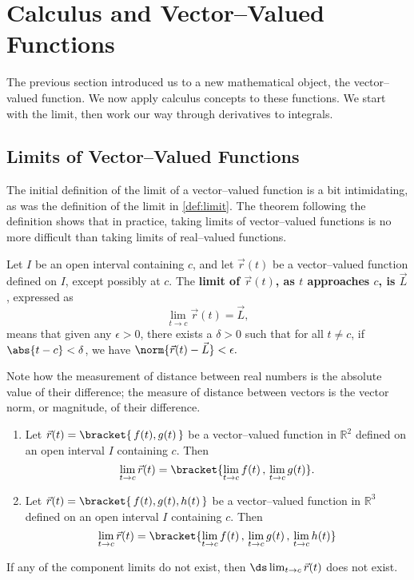 \section{Calculus and Vector--Valued Functions}\label{sec:vvf_calc}

The previous section introduced us to a new mathematical object, the vector--valued function. We now apply calculus concepts to these functions. We start with the limit, then work our way through derivatives to integrals.

\subsection*{Limits of Vector--Valued Functions}

The initial definition of the limit of a vector--valued function is a bit intimidating, as was the definition of the limit in \autoref{def:limit}. The theorem following the definition shows that in practice, taking limits of vector--valued functions is no more difficult than taking limits of real--valued functions.

{Let $I$ be an open interval containing $c$, and let $\vec r(t)$ be a vector--valued function defined on $I$, except possibly at $c$. %
The \textbf{limit of $\vec r(t)$, as $t$ approaches $c$, is $\vec L$}, expressed as 
\[\lim_{t\to c} \vec r(t) = \vec L,\]
means that given any $\epsilon>0$, there exists a $\delta>0$ such that for all $t\neq c$, if $\abs{t-c}<\delta$, we have $\norm{\vec r(t) - \vec L} < \epsilon.$
}

Note how the measurement of distance between real numbers is the absolute value of their difference; the measure of distance between vectors is the vector norm, or magnitude, of their difference.

{\begin{enumerate}
	\item Let $\vec r(t) =\bracket{\,f(t),g(t)\,}$ be a vector--valued function in $\mathbb{R}^2$ defined on an open interval $I$ containing $c$. Then
\[\lim_{t\to c} \vec r(t) =\bracket{\lim_{t\to c}f(t)\, , \,\lim_{t\to c} g(t)}.\]
	\item Let $\vec r(t) =\bracket{\,f(t),g(t),h(t)\,}$ be a vector--valued function in $\mathbb{R}^3$ defined on an open interval $I$ containing $c$. Then 
\[
\lim_{t\to c} \vec r(t)
=\bracket{\lim_{t\to c}f(t)\, , \,\lim_{t\to c} g(t)\,, \,\lim_{t\to c} h(t)}
\]
\end{enumerate}
If any of the component limits do not exist, then $\ds\lim_{t\to c} \vec r(t)$ does not exist.}

